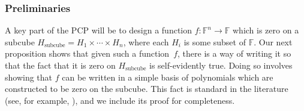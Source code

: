 \documentclass[11pt]{article}
\theoremstyle{definition}
\newcommand{\F}{\ensuremath{\mathbb{F}}}
\begin{document}
\subsubsection{Preliminaries}

A key part of the PCP will be to design a function $f:\F^n \rightarrow \F$ which
is zero on a subcube $H_{\mathrm{subcube}} = H_1 \times \cdots \times H_n$,
where each $H_i$ is some subset of $\F$.
Our next proposition shows that given such a function~$f$, there is a way of
writing it so that the fact that it is zero on $H_{\mathrm{subcube}}$ is
self-evidently true.
Doing so involves showing that $f$ can be written in a simple basis of
polynomials which are constructed to be zero on the subcube.
This fact is standard in the literature (see, for example,
\cite[Proposition~$5.3.5$]{harsha2004robust}), and we include its proof for
completeness.
\end{document}
